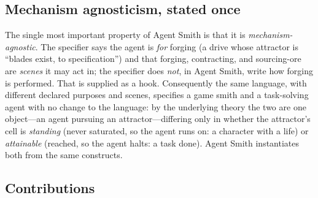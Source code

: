 \documentclass[11pt,twocolumn,a4paper]{article}
\begin{document}
\subsection{Mechanism agnosticism, stated once}

The single most important property of Agent Smith is that it is
\emph{mechanism-agnostic}. The specifier says the agent is \emph{for} forging
(a drive whose attractor is ``blades exist, to specification'') and that
forging, contracting, and sourcing-ore are \emph{scenes} it may act in; the
specifier does \emph{not}, in Agent Smith, write how forging is performed.
That is supplied as a hook. Consequently the same language, with different
declared purposes and scenes, specifies a game smith and a task-solving agent
with no change to the language: by the underlying theory the two are one
object---an agent pursuing an attractor---differing only in whether the
attractor's cell is \emph{standing} (never saturated, so the agent runs on: a
character with a life) or \emph{attainable} (reached, so the agent halts: a
task done). Agent Smith instantiates both from the same constructs.

\subsection{Contributions}
\end{document}
